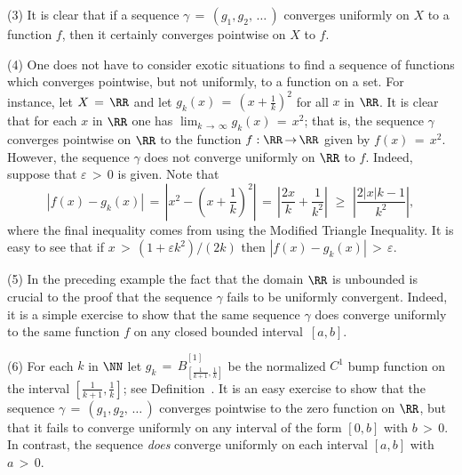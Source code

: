 \V

        (3) It is clear that if a sequence ${\gamma} \,=\, (g_{1},g_{2},\,{\ldots}\,)$ converges uniformly on $X$ to a function $f$,
    then it certainly converges pointwise on $X$ to $f$.

\V

        (4) One does not have to consider exotic situations to find a sequence of functions which converges pointwise, but not uniformly, to a function on a set.
    For instance, let $X \,=\, {\RR}$ and let $g_{k}(x) \,=\, {\displaystyle \left(x+\frac{1}{k}\right)^{2}}$ for all $x$ in ${\RR}$.
    It is clear that for each $x$ in ${\RR}$ one has $\lim_{k \,{\rightarrow}\, {\infty}} g_{k}(x) \,=\, x^{2}$;
    that is, the sequence ${\gamma}$ converges pointwise on ${\RR}$ to the function $f:{\RR} \,{\rightarrow}\, {\RR}$ given by $f(x) \,=\, x^{2}$.
    However, the sequence ${\gamma}$ does not converge uniformly on ${\RR}$ to $f$.
    Indeed, suppose that ${\varepsilon}\,>\,0$ is given. Note that
        \begin{displaymath}
        |f(x) - g_{k}(x)| \,=\, \left|x^{2} - \left(x+\frac{1}{k}\right)^{2}\right| \,=\, \left|\frac{2x}{k} + \frac{1}{k^{2}}\right|\,\,{\geq}\,\,\left|\frac{2|x|k-1}{k^{2}}\right|,
        \end{displaymath}
    where the final inequality comes from using the Modified Triangle Inequality.
    It is easy to see that if $x\,>\,(1+{\varepsilon}k^{2})/(2k)$ then $|f(x)-g_{k}(x)|\,>\,{\varepsilon}$.

\V

        (5) In the preceding example the fact that the domain ${\RR}$ is unbounded is crucial to the proof that the sequence ${\gamma}$ fails to be uniformly convergent.
    Indeed, it is a simple exercise to show that the same sequence ${\gamma}$ does converge uniformly to the same function $f$ on any closed bounded interval~$[a,b]$.

\V

        (6) For each $k$ in ${\NN}$ let ${\displaystyle g_{k} \,=\, \hat{B}_{[\frac{1}{k+1},\frac{1}{k}]}^{[1]}}$
    be the normalized $C^{1}$ bump function on the interval ${\displaystyle \left[\frac{1}{k+1},\frac{1}{k}\right]}$; see Definition~.
    It is an easy exercise to show that the sequence ${\gamma} \,=\, (g_{1},g_{2},\,{\ldots}\,)$ converges pointwise to the zero function on ${\RR}$,
    but that it fails to converge uniformly on any interval of the form $[0,b]$ with $b\,>\,0$.
    In contrast, the sequence {\em does} converge uniformly on each interval $[a,b]$ with $a\,>\,0$.

